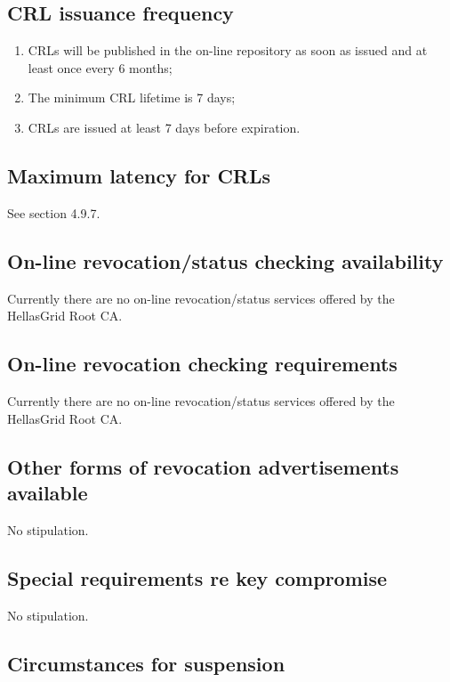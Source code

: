\documentclass[11pt,a4paper,titlepage]{book}
\begin{document}
\subsection{CRL issuance frequency}

\begin{enumerate}
\item{CRLs will be published in the on-line repository as soon as issued and at least once every 6 months;}
\item{The minimum CRL lifetime is 7 days;}
\item{CRLs are issued at least 7 days before expiration.}
\end{enumerate}

\subsection{Maximum latency for CRLs}

See section 4.9.7.

\subsection{On-line revocation/status checking availability}

Currently there are no on-line revocation/status services offered by the HellasGrid Root CA.

\subsection{On-line revocation checking requirements}

Currently there are no on-line revocation/status services offered by the HellasGrid Root CA.

\subsection{Other forms of revocation advertisements available}

No stipulation.

\subsection{Special requirements re key compromise}

No stipulation.

\subsection{Circumstances for suspension}
\end{document}
